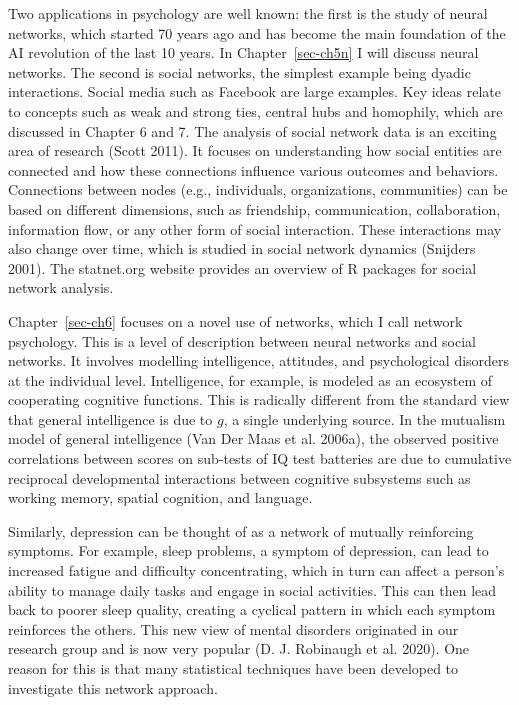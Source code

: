 \documentclass[
  a4paper,
  DIV=11,
  numbers=noendperiod]{scrreprt}
\begin{document}
Two applications in psychology are well known: the first is the study of
neural networks, which started 70 years ago and has become the main
foundation of the AI revolution of the last 10 years. In
Chapter~\ref{sec-ch5n} I will discuss neural networks. The second is
social networks, the simplest example being dyadic interactions. Social
media such as Facebook are large examples. Key ideas relate to concepts
such as weak and strong ties, central hubs and homophily, which are
discussed in Chapter 6 and 7. The analysis of social network data is an
exciting area of research (Scott 2011). It focuses on understanding how
social entities are connected and how these connections influence
various outcomes and behaviors. Connections between nodes (e.g.,
individuals, organizations, communities) can be based on different
dimensions, such as friendship, communication, collaboration,
information flow, or any other form of social interaction. These
interactions may also change over time, which is studied in social
network dynamics (Snijders 2001). The statnet.org website provides an
overview of R packages for social network analysis.

Chapter~\ref{sec-ch6} focuses on a novel use of networks, which I call
network psychology. This is a level of description between neural
networks and social networks. It involves modelling intelligence,
attitudes, and psychological disorders at the individual level.
Intelligence, for example, is modeled as an ecosystem of cooperating
cognitive functions. This is radically different from the standard view
that general intelligence is due to \(g\), a single underlying source.
In the mutualism model of general intelligence (Van Der Maas et al.
2006a), the observed positive correlations between scores on sub-tests
of IQ test batteries are due to cumulative reciprocal developmental
interactions between cognitive subsystems such as working memory,
spatial cognition, and language.

Similarly, depression can be thought of as a network of mutually
reinforcing symptoms. For example, sleep problems, a symptom of
depression, can lead to increased fatigue and difficulty concentrating,
which in turn can affect a person's ability to manage daily tasks and
engage in social activities. This can then lead back to poorer sleep
quality, creating a cyclical pattern in which each symptom reinforces
the others. This new view of mental disorders originated in our research
group and is now very popular (D. J. Robinaugh et al. 2020). One reason
for this is that many statistical techniques have been developed to
investigate this network approach.
\end{document}
